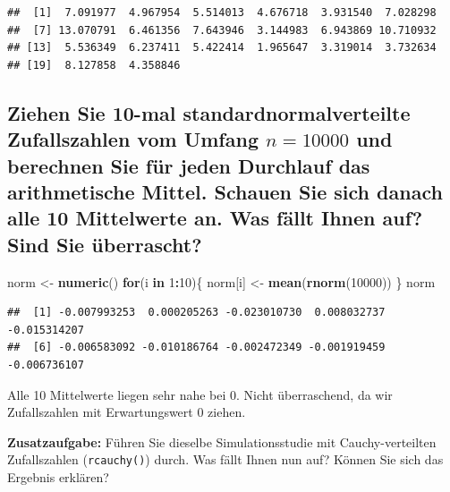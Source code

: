\documentclass[12pt,a4paper]{article}
\newenvironment{Shaded}{\begin{snugshade}}{\end{snugshade}}
\newcommand{\ControlFlowTok}[1]{\textcolor[rgb]{0.13,0.29,0.53}{\textbf{#1}}}
\newcommand{\DecValTok}[1]{\textcolor[rgb]{0.00,0.00,0.81}{#1}}
\newcommand{\FunctionTok}[1]{\textcolor[rgb]{0.13,0.29,0.53}{\textbf{#1}}}
\newcommand{\NormalTok}[1]{#1}
\newcommand{\OtherTok}[1]{\textcolor[rgb]{0.56,0.35,0.01}{#1}}
\newcommand{\SpecialCharTok}[1]{\textcolor[rgb]{0.81,0.36,0.00}{\textbf{#1}}}
\begin{document}
\begin{verbatim}
##  [1]  7.091977  4.967954  5.514013  4.676718  3.931540  7.028298
##  [7] 13.070791  6.461356  7.643946  3.144983  6.943869 10.710932
## [13]  5.536349  6.237411  5.422414  1.965647  3.319014  3.732634
## [19]  8.127858  4.358846
\end{verbatim}

\subsection{\texorpdfstring{Ziehen Sie 10-mal standardnormalverteilte
Zufallszahlen vom Umfang \(n = 10000\) und berechnen Sie für jeden
Durchlauf das arithmetische Mittel. Schauen Sie sich danach alle 10
Mittelwerte an. Was fällt Ihnen auf? Sind Sie
überrascht?}{Ziehen Sie 10-mal standardnormalverteilte Zufallszahlen vom Umfang n = 10000 und berechnen Sie für jeden Durchlauf das arithmetische Mittel. Schauen Sie sich danach alle 10 Mittelwerte an. Was fällt Ihnen auf? Sind Sie überrascht?}}\label{ziehen-sie-10-mal-standardnormalverteilte-zufallszahlen-vom-umfang-n-10000-und-berechnen-sie-fuxfcr-jeden-durchlauf-das-arithmetische-mittel.-schauen-sie-sich-danach-alle-10-mittelwerte-an.-was-fuxe4llt-ihnen-auf-sind-sie-uxfcberrascht}

\begin{Shaded}
\begin{Highlighting}[]
\NormalTok{    norm }\OtherTok{\textless{}{-}} \FunctionTok{numeric}\NormalTok{()}
    \ControlFlowTok{for}\NormalTok{(i }\ControlFlowTok{in} \DecValTok{1}\SpecialCharTok{:}\DecValTok{10}\NormalTok{)\{}
\NormalTok{      norm[i] }\OtherTok{\textless{}{-}} \FunctionTok{mean}\NormalTok{(}\FunctionTok{rnorm}\NormalTok{(}\DecValTok{10000}\NormalTok{))}
\NormalTok{    \}}
\NormalTok{    norm}
\end{Highlighting}
\end{Shaded}

\begin{verbatim}
##  [1] -0.007993253  0.000205263 -0.023010730  0.008032737 -0.015314207
##  [6] -0.006583092 -0.010186764 -0.002472349 -0.001919459 -0.006736107
\end{verbatim}

Alle 10 Mittelwerte liegen sehr nahe bei 0. Nicht überraschend, da wir
Zufallszahlen mit Erwartungswert 0 ziehen.

\textbf{Zusatzaufgabe:} Führen Sie dieselbe Simulationsstudie mit
Cauchy-verteilten Zufallszahlen (\texttt{rcauchy()}) durch. Was fällt
Ihnen nun auf? Können Sie sich das Ergebnis erklären?
\end{document}
